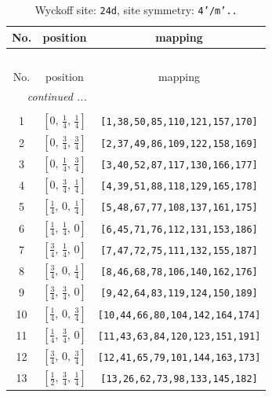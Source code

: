 \documentclass[fleqn,8pt]{jsarticle}
\begin{document}
\begin{longtable}{ccc}
\caption{Wyckoff site: {\tt 24d}, site symmetry: {\tt 4'/m'..}}
 \\
 \hline \hline
No. & position & mapping \\ \hline \endfirsthead

\multicolumn{2}{l}{\tablename\ \thetable{}} \\
 \hline \hline
No. & position & mapping \\ \hline \endhead

 \hline \hline
\multicolumn{2}{r}{\footnotesize\it continued ...} \\ \endfoot

 \hline \hline
\multicolumn{2}{r}{} \\ \endlastfoot

1 & $\left[ 0,\, \frac{1}{4},\, \frac{1}{4} \right]$ & {\tt [1,38,50,85,110,121,157,170]} \\ \hline
2 & $\left[ 0,\, \frac{3}{4},\, \frac{3}{4} \right]$ & {\tt [2,37,49,86,109,122,158,169]} \\ \hline
3 & $\left[ 0,\, \frac{1}{4},\, \frac{3}{4} \right]$ & {\tt [3,40,52,87,117,130,166,177]} \\ \hline
4 & $\left[ 0,\, \frac{3}{4},\, \frac{1}{4} \right]$ & {\tt [4,39,51,88,118,129,165,178]} \\ \hline
5 & $\left[ \frac{1}{4},\, 0,\, \frac{1}{4} \right]$ & {\tt [5,48,67,77,108,137,161,175]} \\ \hline
6 & $\left[ \frac{1}{4},\, \frac{1}{4},\, 0 \right]$ & {\tt [6,45,71,76,112,131,153,186]} \\ \hline
7 & $\left[ \frac{3}{4},\, \frac{1}{4},\, 0 \right]$ & {\tt [7,47,72,75,111,132,155,187]} \\ \hline
8 & $\left[ \frac{3}{4},\, 0,\, \frac{1}{4} \right]$ & {\tt [8,46,68,78,106,140,162,176]} \\ \hline
9 & $\left[ \frac{3}{4},\, \frac{3}{4},\, 0 \right]$ & {\tt [9,42,64,83,119,124,150,189]} \\ \hline
10 & $\left[ \frac{1}{4},\, 0,\, \frac{3}{4} \right]$ & {\tt [10,44,66,80,104,142,164,174]} \\ \hline
11 & $\left[ \frac{1}{4},\, \frac{3}{4},\, 0 \right]$ & {\tt [11,43,63,84,120,123,151,191]} \\ \hline
12 & $\left[ \frac{3}{4},\, 0,\, \frac{3}{4} \right]$ & {\tt [12,41,65,79,101,144,163,173]} \\ \hline
13 & $\left[ \frac{1}{2},\, \frac{3}{4},\, \frac{1}{4} \right]$ & {\tt [13,26,62,73,98,133,145,182]} \\ \hline

\end{longtable}
\end{document}
